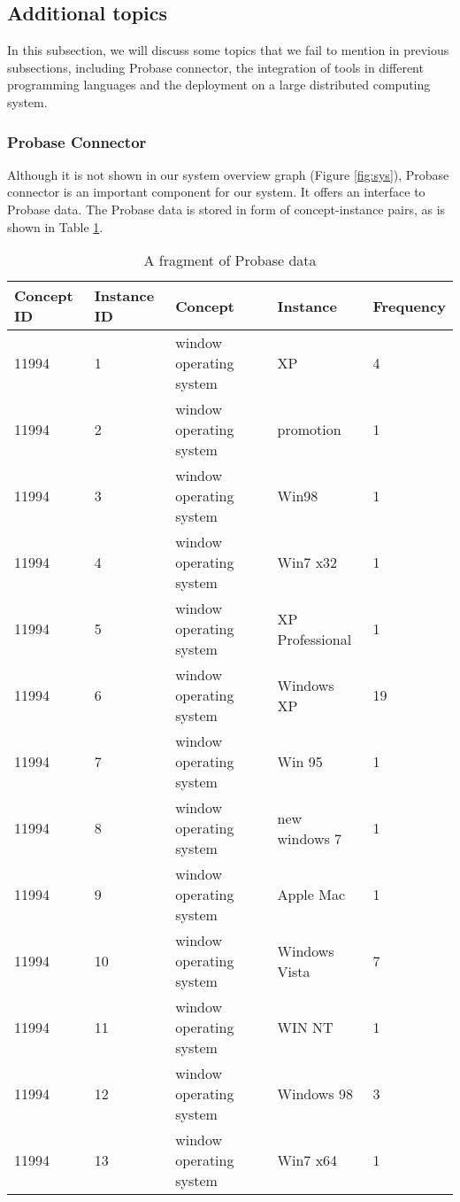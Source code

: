 \subsection{Additional topics}
\label{sec:additionalTopic}

In this subsection, we will discuss some topics that we fail to mention in previous subsections, including Probase connector, the integration of tools in different programming languages and the deployment on a large distributed computing system.

\subsubsection{Probase Connector}
\label{probaseConnector}
Although it is not shown in our system overview graph (Figure \ref{fig:sys}), Probase connector is an important component for our system. It offers an interface to Probase data.
The Probase data is stored in form of concept-instance pairs, as is shown in Table \ref{tab:probaseData}.

\begin{table}
\centering
\caption{A fragment of Probase data}
\begin{tabular}{|l|l|l|l|l|} \hline
Concept ID&Instance ID&Concept&Instance&Frequency\\ \hline
11994&1&window operating system&XP&4\\
11994&2&window operating system&promotion&1\\
11994&3&window operating system&Win98&1\\
11994&4&window operating system&Win7 x32&1\\
11994&5&window operating system&XP Professional&1\\
11994&6&window operating system&Windows XP&19\\
11994&7&window operating system&Win 95&1\\
11994&8&window operating system&new windows 7&1\\
11994&9&window operating system&Apple Mac&1\\
11994&10&window operating system&Windows Vista&7\\
11994&11&window operating system&WIN NT&1\\
11994&12&window operating system&Windows 98&3\\
11994&13&window operating system&Win7 x64&1\\
\hline
\end{tabular}

\label{tab:probaseData}
\end{table}

